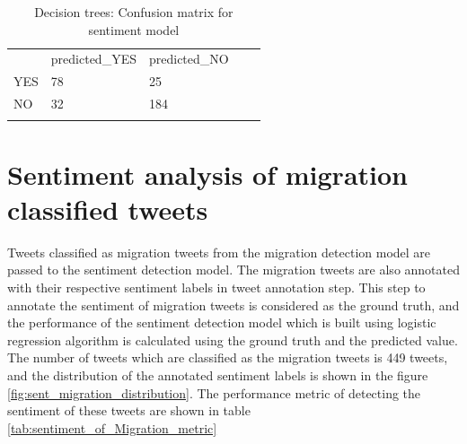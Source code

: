 \begin{table}[]
\centering
\begin{tabular}{lllll}
\cline{1-3}
\multicolumn{1}{|l|}{}   & \multicolumn{1}{l|}{predicted\_YES} & \multicolumn{1}{l|}{predicted\_NO}  &  &  \\ \cline{1-3}
\multicolumn{1}{|l|}{YES} & \multicolumn{1}{l|}{78}  & \multicolumn{1}{l|}{25} &  &  \\ \cline{1-3}
\multicolumn{1}{|l|}{NO}   & \multicolumn{1}{l|}{32}  & \multicolumn{1}{l|}{184}  &  &  \\ \cline{1-3}
                            &                           &                           &  & 
\end{tabular}
\caption{Decision trees: Confusion matrix for sentiment model}
\label{tab:confusionmatrix_migrationtweets}
\end{table}






\section{Sentiment analysis of migration classified tweets}

Tweets classified as migration tweets from the migration detection model are passed to the sentiment detection model. The migration tweets are also annotated with their respective sentiment labels in tweet annotation step. This step to annotate the sentiment of migration tweets is considered as the ground truth, and the performance of the sentiment detection model which is built using logistic regression algorithm is calculated using the ground truth and the predicted value. 
The number of tweets which are classified as the migration tweets is 449 tweets, and the distribution of the annotated sentiment labels is shown in the figure \ref{fig:sent_migration_distribution}. The performance metric of detecting the sentiment of these tweets are shown in table \ref{tab:sentiment_of_Migration_metric}

 

